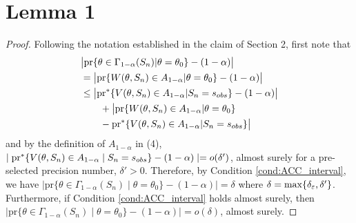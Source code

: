 \section{Lemma 1}
\begin{proof} Following the notation established in the claim of Section 2, first note that 
\begin{align*}
&\big| \text{pr}\{\theta \in \Gamma_{1 - \alpha}(S_{n}) | \theta = \theta_0 \}  - (1 - \alpha) \big|  \\
&= \big| \text{pr}\{W( \theta, S_n) \in A_{1 - \alpha} |  \theta=\theta_0 \}  -  (1 - \alpha) \big|  \\
&\leq   \big|  \text{pr}^*\{V(\theta, S_n) \in A_{1 - \alpha} | S_n = s_{\rm obs}\} - (1 - \alpha)\big|  \\
&\qquad +  \big|  \text{pr}\{W( \theta, S_n) \in A_{1 - \alpha} | \theta=  \theta_0 \} \\
&\qquad - \text{pr}^{*}\{V(\theta, S_n) \in A_{1 - \alpha} |  S_n = s_{\rm obs} \}\big| 
\end{align*} 
and by the definition of $A_{1 - \alpha}$ in (4), $\mid \text{pr}^*\{V(\theta, S_n) \in A_{1 - \alpha} \mid  S_n = s_{\rm obs}\} - (1 - \alpha)\mid   = o(\delta')$, almost surely for a pre-selected precision number, $\delta'>0$. Therefore, by Condition \ref{cond:ACC_interval}, we have $\mid  \text{pr}\{\theta \in \Gamma_{1 - \alpha}(S_{n}) \mid  \theta = \theta_0 \} - (1 - \alpha)\mid = \delta$ where $\delta = \max\{\delta_{\veps},\delta'\}$. Furthermore, if Condition \ref{cond:ACC_interval} holds almost surely, then $\mid \text{pr}\{\theta \in \Gamma_{1 - \alpha}(S_{n}) \mid \theta= \theta_0 \} - (1 - \alpha)\mid  = o(\delta)$, almost surely. 
\end{proof} 

	
